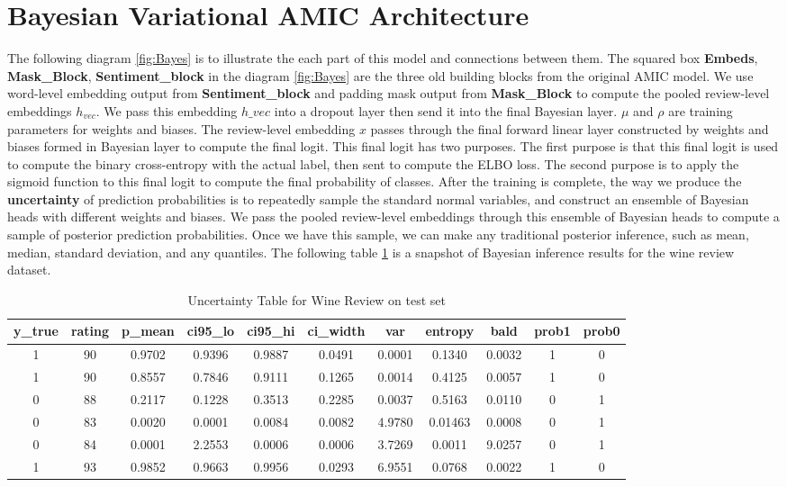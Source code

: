 \documentclass{article}
\begin{document}
\section{Bayesian Variational AMIC Architecture}
The following diagram \ref{fig:Bayes} is to illustrate the each part of this model and connections between them. The squared box \textbf{Embeds}, \textbf{Mask\_Block}, \textbf{Sentiment\_block} in the diagram \ref{fig:Bayes} are the three old building blocks from the original AMIC model. We use word-level embedding output from \textbf{Sentiment\_block} and padding mask output from \textbf{Mask\_Block} to compute the pooled review-level embeddings $h_{vec}$. We pass this embedding $h\_{vec}$ into a dropout layer then send it into the final Bayesian layer. $\mu$ and $\rho$ are training parameters for weights and biases. The review-level embedding $x$ passes through the final forward linear layer constructed by weights and biases formed in Bayesian layer to compute the final logit. This final logit has two purposes. The first purpose is that this final logit is used to compute the binary cross-entropy with the actual label, then sent to compute the ELBO loss. The second purpose is to apply the sigmoid function to this final logit to compute the final probability of classes. After the training is complete, the way we produce the \textbf{uncertainty} of prediction probabilities is to repeatedly sample the standard normal variables, and construct an ensemble of Bayesian heads with different weights and biases. We pass the pooled review-level embeddings through this ensemble of Bayesian heads to compute a sample of posterior prediction probabilities. Once we have this sample, we can make any traditional posterior inference, such as mean, median, standard deviation, and any quantiles. The following table \ref{tab:un} is a snapshot of Bayesian inference results for the wine review dataset. 
\begin{table}[!ht]
    \centering
    \begin{tabular}{|c|c|c|c|c|c|c|c|c|c|c|}
    \hline y\_true & rating & p\_mean & ci95\_lo & ci95\_hi & ci\_width & var & entropy & bald & prob1  & prob0  \\
    \hline 1 & 90 & 0.9702 & 0.9396 & 0.9887 & 0.0491 & 0.0001 & 0.1340 & 0.0032 & 1 & 0  \\
    \hline 1 & 90 & 0.8557 & 0.7846 & 0.9111 & 0.1265 & 0.0014 & 0.4125 & 0.0057 & 1 & 0 \\
    \hline 0 & 88 & 0.2117 & 0.1228 & 0.3513 & 0.2285 & 0.0037 & 0.5163 & 0.0110 & 0 & 1  \\
    \hline 0 & 83 & 0.0020 & 0.0001 & 0.0084 & 0.0082 & 4.9780 & 0.01463 & 0.0008 & 0 &  1 \\
    \hline 0 & 84 & 0.0001 & 2.2553 & 0.0006 & 0.0006 & 3.7269 & 0.0011 & 9.0257 & 0 & 1 \\
    \hline 1 & 93 & 0.9852 & 0.9663 & 0.9956 & 0.0293 & 6.9551 & 0.0768 & 0.0022 & 1 & 0 \\
    \hline
    \end{tabular}
    \caption{Uncertainty Table for Wine Review on test set}
    \label{tab:un}
\end{table}
\end{document}
